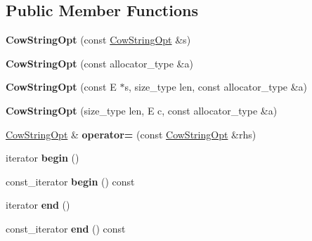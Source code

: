 \subsection*{Public Member Functions}
\begin{DoxyCompactItemize}
\item 
\hypertarget{classCowStringOpt_ab2482728f3a52a875cff5648938b8ed0}{}{\bfseries Cow\+String\+Opt} (const \hyperlink{classCowStringOpt}{Cow\+String\+Opt} \&s)\label{classCowStringOpt_ab2482728f3a52a875cff5648938b8ed0}

\item 
\hypertarget{classCowStringOpt_aea3972952c87db9bb387b6400a590f93}{}{\bfseries Cow\+String\+Opt} (const allocator\+\_\+type \&a)\label{classCowStringOpt_aea3972952c87db9bb387b6400a590f93}

\item 
\hypertarget{classCowStringOpt_ac50780bbe9a9fc8169fd321f97b762c1}{}{\bfseries Cow\+String\+Opt} (const E $\ast$s, size\+\_\+type len, const allocator\+\_\+type \&a)\label{classCowStringOpt_ac50780bbe9a9fc8169fd321f97b762c1}

\item 
\hypertarget{classCowStringOpt_aa00f103effead216b4ed5e4c54949a55}{}{\bfseries Cow\+String\+Opt} (size\+\_\+type len, E c, const allocator\+\_\+type \&a)\label{classCowStringOpt_aa00f103effead216b4ed5e4c54949a55}

\item 
\hypertarget{classCowStringOpt_add51874def27d3c448219a9e9e83b468}{}\hyperlink{classCowStringOpt}{Cow\+String\+Opt} \& {\bfseries operator=} (const \hyperlink{classCowStringOpt}{Cow\+String\+Opt} \&rhs)\label{classCowStringOpt_add51874def27d3c448219a9e9e83b468}

\item 
\hypertarget{classCowStringOpt_ad0c593003e02029ed39ed691f22bfda0}{}iterator {\bfseries begin} ()\label{classCowStringOpt_ad0c593003e02029ed39ed691f22bfda0}

\item 
\hypertarget{classCowStringOpt_a531b46d2ac593679b43ce56ba872fd4f}{}const\+\_\+iterator {\bfseries begin} () const \label{classCowStringOpt_a531b46d2ac593679b43ce56ba872fd4f}

\item 
\hypertarget{classCowStringOpt_a75334118a29f315c0f2cdb3fb9116ec0}{}iterator {\bfseries end} ()\label{classCowStringOpt_a75334118a29f315c0f2cdb3fb9116ec0}

\item 
\hypertarget{classCowStringOpt_a1f941942b6165b303ab6f21cc9dfc9f8}{}const\+\_\+iterator {\bfseries end} () const \label{classCowStringOpt_a1f941942b6165b303ab6f21cc9dfc9f8}


\end{DoxyCompactItemize}
